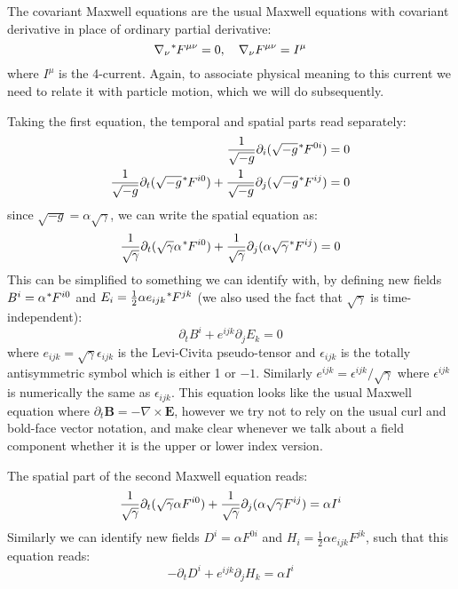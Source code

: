 The covariant Maxwell equations are the usual Maxwell equations with covariant
derivative in place of ordinary partial derivative:
\begin{equation}
  \label{eq:7}
  \nabla_{\nu}\tensor[^{*}]{F}{^{\mu\nu}} = 0, \quad \nabla_{\nu}F^{\mu\nu} = I^{\mu}
\end{equation}
where $I^{\mu}$ is the 4-current. Again, to associate physical meaning to this
current we need to relate it with particle motion, which we will do
subsequently.

Taking the first equation, the temporal and spatial parts read separately:
\begin{align}
  \frac{1}{\sqrt{-g}}\partial_i(\sqrt{-g}\tensor[^{*}]{F}{^{0i}}) &= 0 \\
  \frac{1}{\sqrt{-g}}\partial_t(\sqrt{-g}\tensor[^{*}]{F}{^{i0}}) + \frac{1}{\sqrt{-g}}\partial_j(\sqrt{-g}\tensor[^{*}]{F}{^{ij}}) &= 0
\end{align}
since $\sqrt{-g} = \alpha\sqrt{\gamma}$, we can write the spatial equation as:
\begin{equation}
  \label{eq:10}
  \frac{1}{\sqrt{\gamma}}\partial_t(\sqrt{\gamma}\alpha\tensor[^{*}]{F}{^{i0}}) + \frac{1}{\sqrt{\gamma}}\partial_j(\alpha\sqrt{\gamma}\tensor[^{*}]{F}{^{ij}}) = 0
\end{equation}
This can be simplified to something we can identify with, by defining new fields
$B^i = \alpha\tensor[^{*}]{F}{^{i0}}$ and $E_i = \frac{1}{2}\alpha
e_{ijk}\tensor[^{*}]{F}{^{jk}}$ (we also used the fact that $\sqrt{\gamma}$ is time-independent):
\begin{equation}
  \label{eq:11}
  \partial_tB^i + e^{ijk}\partial_jE_k = 0
\end{equation}
where $e_{ijk} = \sqrt{\gamma}\epsilon_{ijk}$ is the Levi-Civita pseudo-tensor
and $\epsilon_{ijk}$ is the totally antisymmetric symbol which is either 1 or
$-1$. Similarly $e^{ijk} = \epsilon^{ijk}/\sqrt{\gamma}$ where $\epsilon^{ijk}$
is numerically the same as $\epsilon_{ijk}$. This equation looks like the usual
Maxwell equation where $\partial_t\mathbf{B} = -\nabla\times \mathbf{E}$,
however we try not to rely on the usual curl and bold-face vector notation, and
make clear whenever we talk about a field component whether it is the upper or
lower index version.

The spatial part of the second Maxwell equation reads:
\begin{equation}
  \label{eq:14}
  \frac{1}{\sqrt{\gamma}}\partial_t(\sqrt{\gamma}\alpha\tensor{F}{^{i0}}) + \frac{1}{\sqrt{\gamma}}\partial_j(\alpha\sqrt{\gamma}\tensor{F}{^{ij}}) = \alpha I^{i}
\end{equation}
Similarly we can identify new fields $D^i = \alpha F^{0i}$ and $H_i =
\frac{1}{2}\alpha e_{ijk}F^{jk}$, such that this equation reads:
\begin{equation}
  \label{eq:15}
  -\partial_tD^i + e^{ijk}\partial_jH_k = \alpha I^i
\end{equation}

